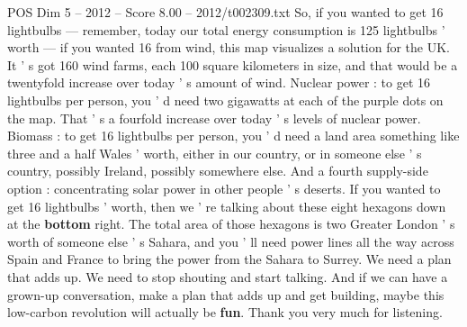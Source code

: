 \begin{textsample}{POS Dim 5 – 2012 – Score 8.00 – 2012/t002309.txt}
So, if you wanted to get 16 lightbulbs — remember, today our total energy consumption is 125 lightbulbs ' worth — if you wanted 16 from wind, this map visualizes a solution for the UK.
It ' s got 160 wind farms, each 100 square kilometers in size, and that would be a twentyfold increase over today ' s amount of wind.
Nuclear power : to get 16 lightbulbs per person, you ' d need two gigawatts at each of the purple dots on the map.
That ' s a fourfold increase over today ' s levels of nuclear power.
Biomass : to get 16 lightbulbs per person, you ' d need a land area something like three and a half Wales ' worth, either in our country, or in someone else ' s country, possibly Ireland, possibly somewhere else.
And a fourth supply-side option : concentrating solar power in other people ' s deserts.
If you wanted to get 16 lightbulbs ' worth, then we ' re talking about these eight hexagons down at the \textbf{bottom} right.
The total area of those hexagons is two Greater London ' s worth of someone else ' s Sahara, and you ' ll need power lines all the way across Spain and France to bring the power from the Sahara to Surrey.
We need a plan that adds up.
We need to stop shouting and start talking.
And if we can have a grown-up conversation, make a plan that adds up and get building, maybe this low-carbon revolution will actually be \textbf{fun}.
Thank you very much for listening.

\end{textsample}
